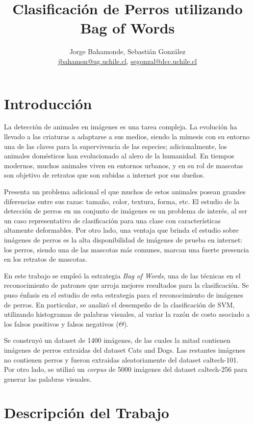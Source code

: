 \documentclass[12pt]{article}
\title{Clasificación de Perros utilizando Bag of Words}
\author{Jorge Bahamonde, Sebastián González\\
\small{\url{jbahamon@ug.uchile.cl}, \url{segonzal@dcc.uchile.cl}}}
\date{}
\begin{document}
\maketitle

\section{Introducción}

La detección de animales en imágenes es una tarea compleja. La evolución ha llevado a
las criaturas a adaptarse a sus medios, siendo la mímesis con su entorno una de
las claves para la supervivencia de las especies; adicionalmente, los animales
domésticos han evolucionado al alero de la humanidad. En tiempos modernos, muchos animales viven en entornos urbanos,
y en su rol de mascotas son objetivo de retratos que son subidas a internet por sus dueños.

Presenta un problema adicional el que muchos de estos animales posean grandes diferencias entre sus razas: tamaño, color, textura, forma, etc.
El estudio de la detección de perros en un conjunto de imágenes es un problema
de interés, al ser un caso representativo de clasificación para una clase con características
altamente deformables. Por otro lado, una ventaja que brinda el estudio sobre
imágenes de perros es la alta disponibilidad de imágenes de prueba en internet:
los perros, siendo una de las mascotas más comunes, marcan una fuerte presencia en los retratos de mascotas.

En este trabajo se empleó la estrategia \emph{Bag of Words}, una de las técnicas en el reconocimiento de patrones que arroja mejores resultados para la clasificación.
Se puso énfasis en el estudio de esta estrategia para el reconocimiento de
imágenes de perros. En particular, se analizó el desempeño de la clasificación de SVM,
utilizando histogramas de palabras visuales, al variar la razón de costo asociado a los falsos positivos y falsos negativos ($\Theta$).

Se construyó un dataset de 1400 imágenes, de las cuales la mitad contienen
imágenes de perros extraidas del dataset Cats and Dogs.\cite{parkhi12a} Las
restantes imágenes no contienen perros y fueron extraidas aleatoriamente del
dataset caltech-101\cite{caltech101}. Por otro lado, se utilizó un \emph{corpus}
de 5000 imágenes del dataset caltech-256\cite{griffin2007caltech} para generar
las palabras visuales.

\section{Descripción del Trabajo}
\end{document}

